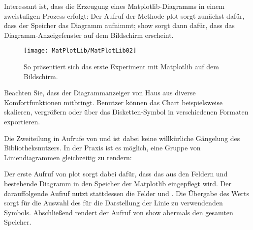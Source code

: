 \medskip



\medskip

Interessant ist, dass die Erzeugung eines Matplotlib-Diagramms in einem zweistufigen Prozess erfolgt: Der Aufruf der Methode plot sorgt zunächst dafür, dass der Speicher das Diagramm aufnimmt; show sorgt dann dafür, dass das Diagramm-Anzeigefenster auf dem Bildschirm erscheint.


\begin{figure}
    \begin{center}  
        \texttt{[image: MatPlotLib/MatPlotLib02]}      
        
        \caption{So präsentiert sich das erste Experiment mit Matplotlib auf dem Bildschirm.}\label{Matplotlib02}
    \end{center}    
\end{figure}





Beachten Sie, dass der Diagrammanzeiger von Haus aus diverse Komfortfunktionen mitbringt. Benutzer können das Chart beispielsweise skalieren, vergrößern oder über das Disketten-Symbol in verschiedenen Formaten exportieren.

Die Zweiteilung in Aufrufe von  und  ist dabei keine willkürliche Gängelung des Bibliotheksnutzers. In der Praxis ist es möglich, eine Gruppe von Liniendiagrammen gleichzeitig zu rendern:

\medskip


\PYTHON{}




\PYTHON{}


\medskip

Der erste Aufruf von plot sorgt dabei dafür, dass das aus den Feldern  und  bestehende Diagramm in den Speicher der Matplotlib eingepflegt wird. Der darauffolgende Aufruf nutzt stattdessen die Felder  und . Die Übergabe des Werts  sorgt für die Auswahl des für die Darstellung der Linie zu verwendenden Symbols. Abschließend rendert der Aufruf von show abermals den gesamten Speicher.

